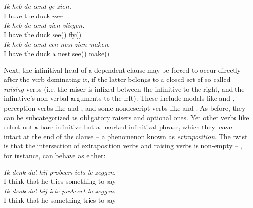 \begin{exe}
\ex\label{gloss:ipp}
\begin{xlist}
\ex 
\gll \textit{Ik} \textit{heb} \textit{de} \textit{eend} \textit{ge-zien.}\\
I have the duck -see\\
\ex
\gll \textit{Ik} \textit{heb} \textit{de} \textit{eend} \textit{zien} \textit{vliegen.}\\
I have the duck see() fly()\\
\ex\label{gloss:ipp_tv}
\gll \textit{Ik} \textit{heb} \textit{de} \textit{eend} \textit{een} \textit{nest} \textit{zien} \textit{maken.}\\
I have the duck a nest see() make()\\
\end{xlist}
\end{exe}
Next, the infinitival head of a dependent clause may be forced to occur directly after the verb dominating it, if the latter belongs to a closed set of so-called \textit{raising} verbs (i.e. the raiser is infixed between the infinitive to the right, and the infinitive's non-verbal arguments to the left).
These include modals like  and , perception verbs like  and , and some nondescript verbs like  and .
As before, they can be subcategorized as obligatory raisers and optional ones.
Yet other verbs like  select not a bare infinitive but a -marked infinitival phrase, which they leave intact at the end of the clause -- a phenomenon known as \textit{extraposition}.
The twist is that the intersection of extraposition verbs and raising verbs is non-empty -- , for instance, can behave as either:
\begin{exe}
\ex\label{gloss:vr_vs_xpos}
\begin{xlist}
\ex
\gll \textit{Ik} \textit{denk} \textit{dat} \textit{hij} \textit{probeert} \textit{iets} \textit{te} \textit{zeggen}.\\
I think that he tries something to say\\
\ex
\gll \textit{Ik} \textit{denk} \textit{dat} \textit{hij} \textit{iets} \textit{probeert} \textit{te} \textit{zeggen}.\\
I think that he something tries to say\\
\end{xlist}
\end{exe}

